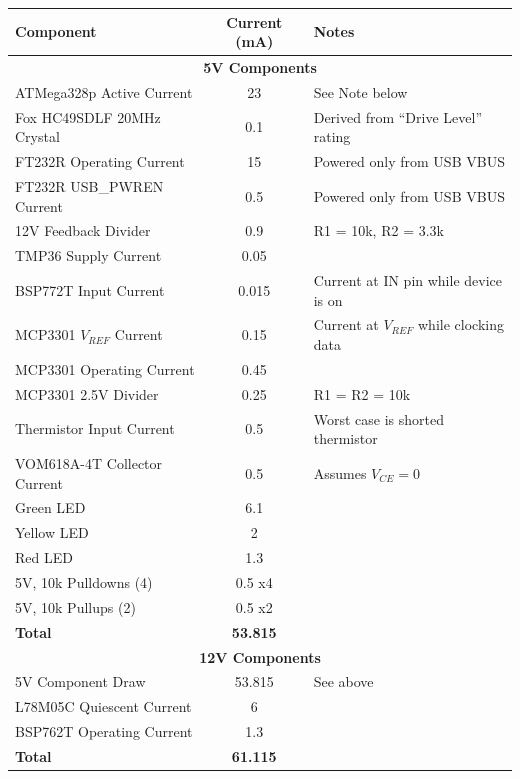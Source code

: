 \documentclass{article}
\begin{document}
\begin{center}
    \begin{tabular}{|l|c|l|}
        \hline
        Component & Current (mA) & Notes \\
        \hline
        \multicolumn{3}{|c|}{\textbf{5V Components}} \\
        \hline
        ATMega328p Active Current & 23 & See Note below \\
        Fox HC49SDLF 20MHz Crystal & 0.1 & Derived from ``Drive Level'' rating \\
        FT232R Operating Current & 15 & Powered only from USB VBUS \\
        FT232R USB\_PWREN Current & 0.5 & Powered only from USB VBUS \\
        12V Feedback Divider & 0.9 & R1 = 10k\textOmega{}, R2 = 3.3k\textOmega{} \\
        TMP36 Supply Current & 0.05 & \\
        BSP772T Input Current & 0.015 & Current at IN pin while device is on \\
        MCP3301 $V_{REF}$ Current &  0.15 & Current at $V_{REF}$ while clocking data \\
        MCP3301 Operating Current & 0.45 & \\
        MCP3301 2.5V Divider & 0.25 & R1 = R2 = 10k\textOmega{} \\
        Thermistor Input Current & 0.5 & Worst case is shorted thermistor \\
        VOM618A-4T Collector Current & 0.5 & Assumes $V_{CE} = 0$ \\
        Green LED & 6.1 & \\
        Yellow LED & 2 & \\
        Red LED & 1.3  & \\
        5V, 10k\textOmega{} Pulldowns (4) & 0.5 x4 & \\
        5V, 10k\textOmega{} Pullups (2) & 0.5 x2 & \\
        \textbf{Total} & \textbf{53.815} & \\ 

        \hline
        \hline

        \multicolumn{3}{|c|}{\textbf{12V Components}} \\
        \hline
        5V Component Draw & 53.815 & See above \\
        L78M05C Quiescent Current & 6 & \\
        BSP762T Operating Current & 1.3 & \\
        \textbf{Total} & \textbf{61.115} & \\
        \hline
    \end{tabular}
\end{center}
\end{document}
